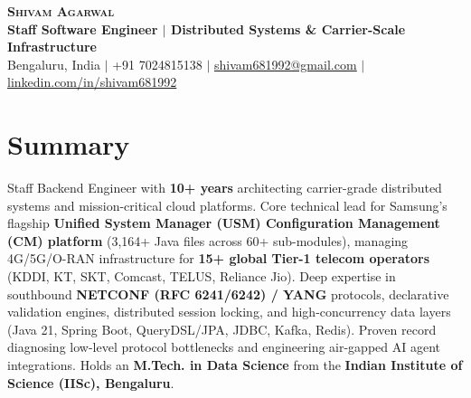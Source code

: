 \documentclass[letterpaper,10pt]{article}
\begin{document}
\begin{center}
    \textbf{\Large \scshape Shivam Agarwal} \\ \vspace{2pt}
    \small \textbf{Staff Software Engineer $|$ Distributed Systems \& Carrier-Scale Infrastructure} \\ \vspace{2pt}
    Bengaluru, India $|$ +91 7024815138 $|$ \href{mailto:shivam681992@gmail.com}{\underline{shivam681992@gmail.com}} $|$ \href{https://linkedin.com/in/shivam681992}{\underline{linkedin.com/in/shivam681992}}
\end{center}
\vspace{-12pt}

\section{Summary}
\small{Staff Backend Engineer with \textbf{10+ years} architecting carrier-grade distributed systems and mission-critical cloud platforms. Core technical lead for Samsung's flagship \textbf{Unified System Manager (USM) Configuration Management (CM) platform} (3,164+ Java files across 60+ sub-modules), managing 4G/5G/O-RAN infrastructure for \textbf{15+ global Tier-1 telecom operators} (KDDI, KT, SKT, Comcast, TELUS, Reliance Jio). Deep expertise in southbound \textbf{NETCONF (RFC 6241/6242) / YANG} protocols, declarative validation engines, distributed session locking, and high-concurrency data layers (Java 21, Spring Boot, QueryDSL/JPA, JDBC, Kafka, Redis). Proven record diagnosing low-level protocol bottlenecks and engineering air-gapped AI agent integrations. Holds an \textbf{M.Tech. in Data Science} from the \textbf{Indian Institute of Science (IISc), Bengaluru}.}
\vspace{-3pt}

\end{document}
